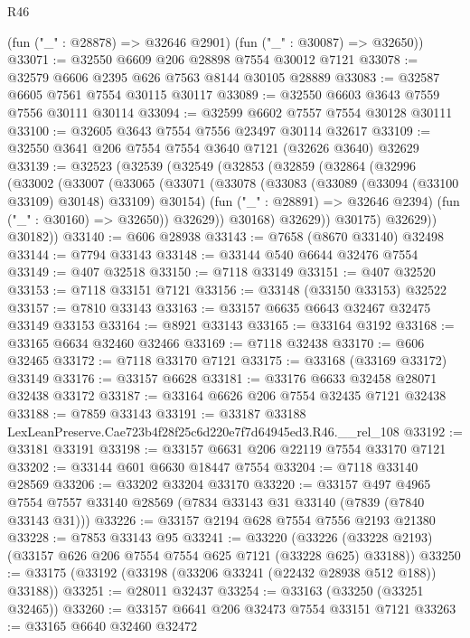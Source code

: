 \begin{lexlean}{R46}
\begin{coremodule}
      (fun ("_" : @28878) => @32646 @2901)
      (fun ("_" : @30087) => @32650))
@33071 := @32550 @6609 @206 @28898 @7554 @30012 @7121
@33078 := @32579 @6606 @2395 @626 @7563 @8144 @30105 @28889
@33083 := @32587 @6605 @7561 @7554 @30115 @30117
@33089 := @32550 @6603 @3643 @7559 @7556 @30111 @30114
@33094 := @32599 @6602 @7557 @7554 @30128 @30111
@33100 := @32605 @3643 @7554 @7556 @23497 @30114 @32617
@33109 := @32550 @3641 @206 @7554 @7554 @3640 @7121 (@32626 @3640) @32629
@33139 := @32523
    (@32539
      (@32549
        (@32853
          (@32859
            (@32864
              (@32996
                (@33002
                  (@33007
                    (@33065
                      (@33071
                        (@33078
                          (@33083 (@33089 (@33094 (@33100 @33109) @30148) @33109) @30154)
                          (fun ("_" : @28891) => @32646 @2394)
                          (fun ("_" : @30160) => @32650))
                        @32629))
                    @30168)
                  @32629))
              @30175)
            @32629))
        @30182))
@33140 := @606 @28938
@33143 := @7658 (@8670 @33140) @32498
@33144 := @7794 @33143
@33148 := @33144 @540 @6644 @32476 @7554
@33149 := @407 @32518
@33150 := @7118 @33149
@33151 := @407 @32520
@33153 := @7118 @33151 @7121
@33156 := @33148 (@33150 @33153) @32522
@33157 := @7810 @33143
@33163 := @33157 @6635 @6643 @32467 @32475 @33149 @33153
@33164 := @8921 @33143
@33165 := @33164 @3192
@33168 := @33165 @6634 @32460 @32466
@33169 := @7118 @32438
@33170 := @606 @32465
@33172 := @7118 @33170 @7121
@33175 := @33168 (@33169 @33172) @33149
@33176 := @33157 @6628
@33181 := @33176 @6633 @32458 @28071 @32438 @33172
@33187 := @33164 @6626 @206 @7554 @32435 @7121 @32438
@33188 := @7859 @33143
@33191 := @33187 @33188 LexLeanPreserve.Cae723b4f28f25c6d220e7f7d64945ed3.R46.__rel_108
@33192 := @33181 @33191
@33198 := @33157 @6631 @206 @22119 @7554 @33170 @7121
@33202 := @33144 @601 @6630 @18447 @7554
@33204 := @7118 @33140 @28569
@33206 := @33202 @33204 @33170
@33220 := @33157
    @497
    @4965
    @7554
    @7557
    @33140
    @28569
    (@7834 @33143 @31 @33140 (@7839 (@7840 @33143 @31)))
@33226 := @33157 @2194 @628 @7554 @7556 @2193 @21380
@33228 := @7853 @33143 @95
@33241 := @33220
    (@33226 (@33228 @2193) (@33157 @626 @206 @7554 @7554 @625 @7121 (@33228 @625) @33188))
@33250 := @33175 (@33192 (@33198 (@33206 @33241 (@22432 @28938 @512 @188)) @33188))
@33251 := @28011 @32437
@33254 := @33163 (@33250 (@33251 @32465))
@33260 := @33157 @6641 @206 @32473 @7554 @33151 @7121
@33263 := @33165 @6640 @32460 @32472

\end{coremodule}
\end{lexlean}
